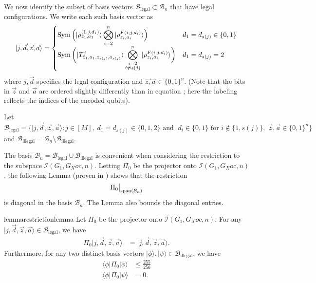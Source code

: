 \documentclass[../thesis-main/thesis-main]{subfiles}
\begin{document}
We now identify the subset of basis vectors $\mathcal{B}_{\text{legal}}\subset\mathcal{B}_{n}$ that have legal configurations. We write each such basis vector as
\begin{equation}
|j,\vec{d},\vec{z},\vec{a}\rangle=\begin{cases}
\operatorname{Sym}\Big(|\rho_{z_{1},a_{1}}^{(1,j,d_{1})}\rangle\displaystyle\bigotimes_{i=2}^{n}|\rho_{z_{i},a_{i}}^{F(i,j,d_{i})}\rangle\Big) & d_{1}=d_{s(j)}\in\{0,1\}\\
\operatorname{Sym}\bigg(|T_{z_{1},a_{1},z_{s(j)},a_{s(j)}}^{j}\rangle\displaystyle\bigotimes_{\substack{i=2\\i\neq s(j)}}^n |\rho_{z_{i},a_{i}}^{F(i,j,d_{i})}\rangle\bigg) & d_{1}=d_{s(j)}=2
\end{cases}\label{eq:legal_states}
\end{equation}
where $j,\vec{d}$ specifies the legal configuration and $\vec{z,}\vec{a}\in\{0,1\}^{n}$. (Note that the bits in $\vec{z}$ and $\vec{a}$ are ordered slightly differently than in equation ; here the labeling reflects the indices of the encoded qubits). 

\begin{definition}
Let 
\begin{equation}
\mathcal{B}_{\text{legal}}=\big\{ |j,\vec{d},\vec{z},\vec{a}\rangle\colon j\in [M],\; d_{1}=d_{s(j)}\in\{0,1,2\}\text{ and }\; d_{i}\in\{0,1\}\text{ for }i\notin\{1,s(j)\},\;\vec{z},\vec{a}\in\{0,1\}^{n}\big\} 
\end{equation}
 and $\mathcal{B}_{\text{illegal}}=\mathcal{B}_{n}\setminus\mathcal{B}_{\text{illegal}}.$ 
\end{definition}

The basis $\mathcal{B}_{n}=\mathcal{B}_{\text{legal}}\cup\mathcal{B}_{\text{illegal}}$ is convenient when considering the restriction to the subspace $\mathcal{I}(G_{1},G_Xoc,n)$. Letting $\Pi_{0}$ be the projector onto $\mathcal{I}(G_{1},G_Xoc,n)$, the following Lemma (proven in ) shows that the restriction 
\begin{equation}
\Pi_{0}\big|_{\operatorname{span}(\mathcal{B}_{n})}\label{eq:restrictionBn}
\end{equation}
is diagonal in the basis $\mathcal{B}_n$. The Lemma also bounds the diagonal entries.

\begin{restatable}{lemma}{restrictionlemma}
\label{lem:Pi_0_restriction}
Let $\Pi_{0}$ be the projector onto $\mathcal{I}(G_{1},G_Xoc,n)$. For any $|j,\vec{d},\vec{z},\vec{a}\rangle\in\mathcal{B}_{\text{legal}}$, we have
\begin{align}
\Pi_{0}|j,\vec{d},\vec{z},\vec{a}\rangle & =|j,\vec{d},\vec{z},\vec{a}\rangle\label{eq:subspace_eqn0}.
\end{align}
Furthermore, for any two distinct basis vectors $|\phi\rangle,|\psi\rangle\in\mathcal{B}_{\text{illegal}}$, we have 
\begin{align}
\langle\phi|\Pi_{0}|\phi\rangle & \leq\frac{255}{256}\label{eq:subspace_eqn1}\\
\langle\phi|\Pi_{0}|\psi\rangle & =0.\label{eq:subspace_eqn2}
\end{align}
\end{restatable}
\end{document}
